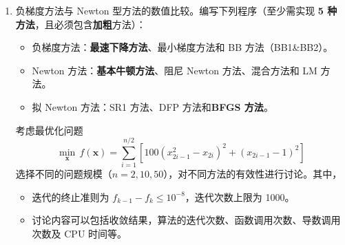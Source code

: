\documentclass[cn,a4paper,12pt,founder,mtpro2]{elegantpaper}
\begin{document}
\begin{enumerate}
    \item 负梯度方法与 Newton 型方法的数值比较。编写下列程序（至少需实现 \textbf{5 种方法}，且必须包含\textbf{加粗}方法）：
          \begin{itemize}
              \item 负梯度方法：\textbf{最速下降方法}、最小梯度方法和 BB 方法（BB1\&BB2）。
              \item Newton 方法：\textbf{基本牛顿方法}、阻尼 Newton 方法、混合方法和 LM 方法。
              \item 拟 Newton 方法：SR1 方法、DFP 方法和\textbf{BFGS 方法}。
          \end{itemize}

          考虑最优化问题
          \begin{equation}
              \min_{\mathbf{x}}\,f(\mathbf{x})=\sum_{i=1}^{n/2}\left[100\left(x_{2i-1}^{2}-x_{2i}\right)^{2}+\left(x_{2i-1}-1\right)^{2}\right]
          \end{equation}
          选择不同的问题规模（$n=2,10,50$），对不同方法的有效性进行讨论。其中，
          \begin{itemize}
              \item 迭代的终止准则为 $f_{k-1}-f_{k}\leq 10^{-8}$，迭代次数上限为 1000。
              \item 讨论内容可以包括收敛结果，算法的迭代次数、函数调用次数、导数调用次数及 CPU 时间等。
          \end{itemize}


\end{enumerate}
\end{document}
